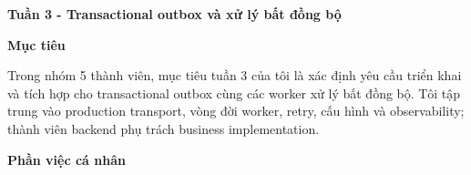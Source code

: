 \vspace{0.5em}\noindent\textbf{Tuần 3 - Transactional outbox và xử lý bất đồng
bộ}\par

\vspace{0.5em}\noindent\textbf{Mục tiêu}\par

Trong nhóm 5 thành viên, mục tiêu tuần 3 của tôi là xác định yêu cầu
triển khai và tích hợp cho transactional outbox cùng các worker xử lý
bất đồng bộ. Tôi tập trung vào production transport, vòng đời worker,
retry, cấu hình và observability; thành viên backend phụ trách business
implementation.

\vspace{0.5em}\noindent\textbf{Phần việc cá nhân}\par

